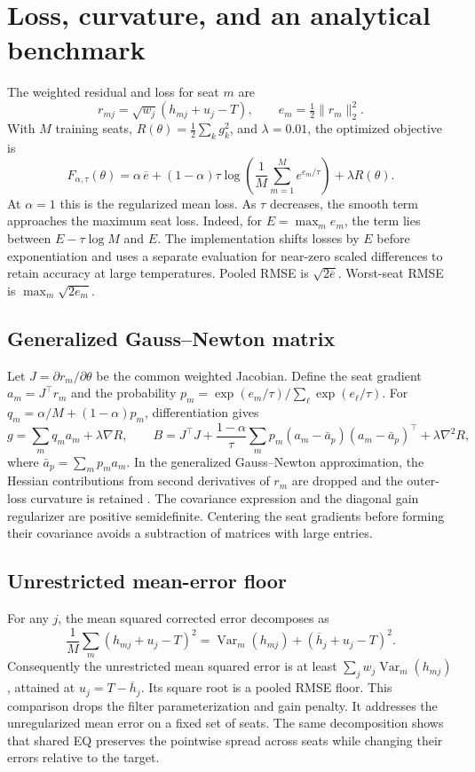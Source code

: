\documentclass[11pt,letterpaper]{article}
\begin{document}
\clearpage
\section{Loss, curvature, and an analytical benchmark}
The weighted residual and loss for seat $m$ are
\[
 r_{mj}=\sqrt{w_j}(h_{mj}+u_j-T),\qquad
 e_m=\tfrac12\|r_m\|_2^2.
\]
With $M$ training seats, $R(\theta)=\tfrac12\sum_k g_k^2$, and
$\lambda=0.01$, the optimized objective is
\[
 F_{\alpha,\tau}(\theta)
 =\alpha\,\overline e+
 (1-\alpha)\tau\log\!\left(\frac1M\sum_{m=1}^M e^{e_m/\tau}\right)
 +\lambda R(\theta).
\]
At $\alpha=1$ this is the regularized mean loss. As $\tau$ decreases, the
smooth term approaches the maximum seat loss. Indeed, for
$E=\max_m e_m$, the term lies between $E-\tau\log M$ and $E$.
The implementation shifts losses by $E$ before exponentiation and uses
a separate evaluation for near-zero scaled differences to retain accuracy
at large temperatures. Pooled RMSE is $\sqrt{2\overline e}$.
Worst-seat RMSE is $\max_m\sqrt{2e_m}$.

\subsection{Generalized Gauss--Newton matrix}
Let $J=\partial r_m/\partial\theta$ be the common weighted Jacobian.
Define the seat gradient $a_m=J^\top r_m$ and the probability
$p_m=\exp(e_m/\tau)/\sum_\ell\exp(e_\ell/\tau)$.
For $q_m=\alpha/M+(1-\alpha)p_m$, differentiation gives
\[
 g=\sum_m q_m a_m+\lambda\nabla R,\qquad
 B=J^\top J+\frac{1-\alpha}{\tau}
      \sum_m p_m (a_m-\bar a_p)(a_m-\bar a_p)^\top+\lambda\nabla^2R ,
\]
where $\bar a_p=\sum_m p_m a_m$. In the generalized Gauss--Newton
approximation, the Hessian contributions from second derivatives of $r_m$
are dropped and the outer-loss curvature is retained \cite{schraudolph}.
The covariance expression and the diagonal gain regularizer are positive
semidefinite. Centering the seat gradients before forming their covariance
avoids a subtraction of matrices with large entries.

\subsection{Unrestricted mean-error floor}
For any $j$, the mean squared corrected error decomposes as
\[
  \frac1M\sum_m(h_{mj}+u_j-T)^2
   =\operatorname{Var}_m(h_{mj})+(\overline h_j+u_j-T)^2.
\]
Consequently the unrestricted mean squared error is at least
$\sum_j w_j\operatorname{Var}_m(h_{mj})$, attained at
$u_j=T-\overline h_j$. Its square root is a pooled RMSE floor.
This comparison drops the filter parameterization and gain penalty.
It addresses the unregularized mean error on a fixed set of seats.
The same decomposition shows that shared EQ preserves the pointwise
spread across seats while changing their errors relative to the target.
\end{document}
